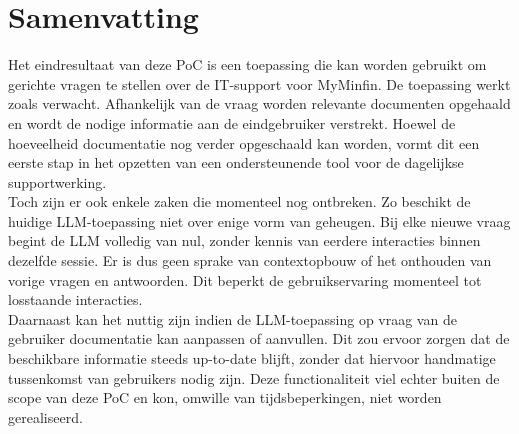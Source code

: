 \section{Samenvatting}


Het eindresultaat van deze PoC is een toepassing die kan worden gebruikt om gerichte vragen te stellen over de IT-support voor MyMinfin. De toepassing werkt zoals verwacht. Afhankelijk van de vraag worden relevante documenten opgehaald en wordt de nodige informatie aan de eindgebruiker verstrekt. Hoewel de hoeveelheid documentatie nog verder opgeschaald kan worden, vormt dit een eerste stap in het opzetten van een ondersteunende tool voor de dagelijkse supportwerking.
\\[1em]
Toch zijn er ook enkele zaken die momenteel nog ontbreken. Zo beschikt de huidige LLM-toepassing niet over enige vorm van geheugen. Bij elke nieuwe vraag begint de LLM volledig van nul, zonder kennis van eerdere interacties binnen dezelfde sessie. Er is dus geen sprake van contextopbouw of het onthouden van vorige vragen en antwoorden. Dit beperkt de gebruikservaring momenteel tot losstaande interacties.
\\[1em]
Daarnaast kan het nuttig zijn indien de LLM-toepassing op vraag van de gebruiker documentatie kan aanpassen of aanvullen. Dit zou ervoor zorgen dat de beschikbare informatie steeds up-to-date blijft, zonder dat hiervoor handmatige tussenkomst van gebruikers nodig zijn. Deze functionaliteit viel echter buiten de scope van deze PoC en kon, omwille van tijdsbeperkingen, niet worden gerealiseerd.
